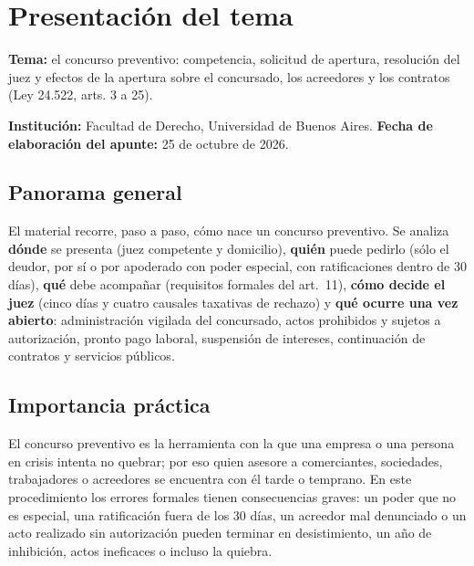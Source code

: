 \documentclass[12pt,oneside]{book}
\begin{document}
\tableofcontents


\chapter*{Presentación del tema}

\textbf{Tema:} el concurso preventivo: competencia, solicitud de apertura, resolución del juez y efectos de la apertura sobre el concursado, los acreedores y los contratos (Ley 24.522, arts. 3 a 25).

\textbf{Institución:} Facultad de Derecho, Universidad de Buenos Aires. \textbf{Fecha de elaboración del apunte:} 25 de octubre de 2026.

\section*{Panorama general}

El material recorre, paso a paso, cómo nace un concurso preventivo. Se analiza \textbf{dónde} se presenta (juez competente y domicilio), \textbf{quién} puede pedirlo (sólo el deudor, por sí o por apoderado con poder especial, con ratificaciones dentro de 30 días), \textbf{qué} debe acompañar (requisitos formales del art.~11), \textbf{cómo decide el juez} (cinco días y cuatro causales taxativas de rechazo) y \textbf{qué ocurre una vez abierto}: administración vigilada del concursado, actos prohibidos y sujetos a autorización, pronto pago laboral, suspensión de intereses, continuación de contratos y servicios públicos.

\section*{Importancia práctica}

El concurso preventivo es la herramienta con la que una empresa o una persona en crisis intenta no quebrar; por eso quien asesore a comerciantes, sociedades, trabajadores o acreedores se encuentra con él tarde o temprano. En este procedimiento los errores formales tienen consecuencias graves: un poder que no es especial, una ratificación fuera de los 30 días, un acreedor mal denunciado o un acto realizado sin autorización pueden terminar en desistimiento, un año de inhibición, actos ineficaces o incluso la quiebra.
\end{document}
